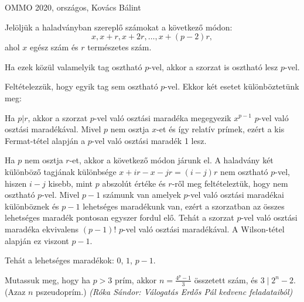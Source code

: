 \begin{flushright}
	OMMO 2020, országos, Kovács Bálint 
	\par\end{flushright}
\begin{solution}
	Jelöljük a haladványban szereplő számokat a következő módon: 
	\[
	x,x+r,x+2r,\dots,x+(p-2)r,
	\]
	ahol $x$ egész szám és $r$ természetes szám.
	
	Ha ezek közül valamelyik tag osztható $p$-vel, akkor a szorzat is
	osztható lesz $p$-vel.
	
	Feltételezzük, hogy egyik tag sem osztható $p$-vel. Ekkor két esetet
	különböztetünk meg:
	
	Ha $p|r$, akkor a szorzat $p$-vel való osztási maradéka megegyezik
	$x^{p-1}$ $p$-vel való osztási maradékával. Mivel $p$ nem osztja
	$x$-et és így relatív prímek, ezért a kis Fermat-tétel alapján a
	$p$-vel való osztási maradék 1 lesz.
	
	Ha $p$ nem osztja $r$-et, akkor a következő módon járunk el. A haladvány
	két különböző tagjának különbsége $x+ir-x-jr=(i-j)r$ nem osztható
	$p$-vel, hiszen $i-j$ kisebb, mint $p$ abszolút értéke és $r$-ről
	meg feltételeztük, hogy nem osztható $p$-vel. Mivel $p-1$ számunk
	van amelyek $p$-vel való osztási maradékai különböznek és $p-1$
	lehetséges maradékunk van, ezért a szorzatban az összes lehetséges
	maradék pontosan egyszer fordul elő. Tehát a szorzat $p$-vel való
	osztási maradéka ekvivalens $(p-1)!$ $p$-vel való osztási maradékával.
	A Wilson-tétel alapján ez viszont $p-1$.
	
	Tehát a lehetséges maradékok: $0$, $1$, $p-1$. 
\end{solution}
\begin{extraproblem}
	Mutassuk meg, hogy ha $p>3$ prím, akkor $n=\frac{4^{p}-1}{3}$
	összetett szám, és $3\mid2^{n}-2$. (Azaz $n$ pszeudoprím.) \emph{(Róka
		Sándor: Válogatás Erdős Pál kedvenc feladataiból)}
\end{extraproblem}

